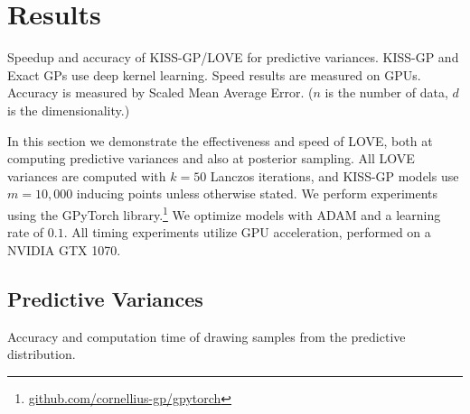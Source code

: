 \section{Results}
\label{sec:love_results}

\begin{table}[t!]
  \caption{
    Speedup and accuracy of KISS-GP/LOVE{} for predictive variances.
    KISS-GP and Exact GPs use deep kernel learning.
    Speed results are measured on GPUs.
    Accuracy is measured by Scaled Mean Average Error.
    ($n$ is the number of data, $d$ is the dimensionality.)
    \label{tab:large_dataset_results}
  }
  \vspace{0.5ex}
  \centering
  \resizebox{\textwidth}{!}{%
    
  }
\end{table}

In this section we demonstrate the effectiveness and speed of LOVE{}, both at computing predictive variances and also at posterior sampling.
All LOVE{} variances are computed with $k=50$ Lanczos iterations,
and KISS-GP models use $m\!=\!10,\!000$ inducing points unless otherwise stated.
We perform experiments using the GPyTorch library.\footnote{
  \url{github.com/cornellius-gp/gpytorch}}
We optimize models with ADAM \cite{kingma2014adam} and a learning rate of $0.1$.
All timing experiments utilize GPU acceleration, performed on a NVIDIA GTX 1070.

\subsection{Predictive Variances}
\label{sec:results_variances}

\begin{table}[t!]
  \caption{
    Accuracy and computation time of drawing samples from the predictive distribution.
    \label{tab:sampling_results}
  }
  \vspace{0.5ex}
  \centering
  \resizebox{\textwidth}{!}{%
    
  }
\end{table}

